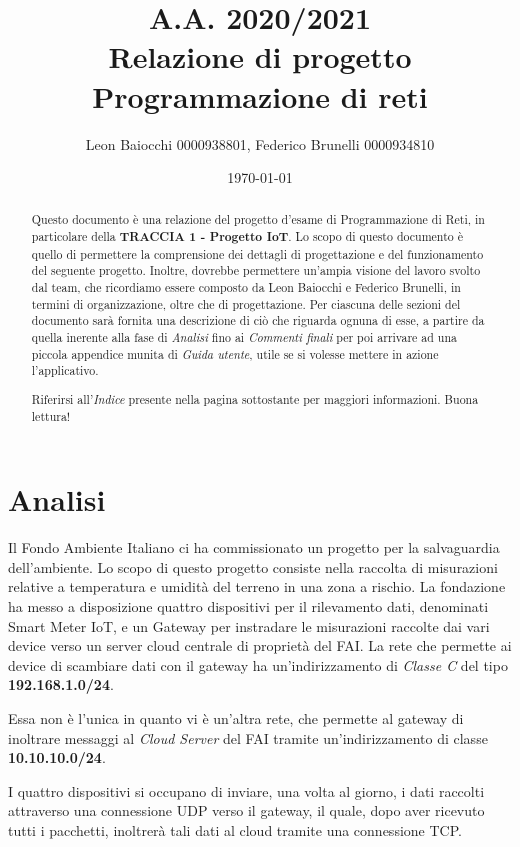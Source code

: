 \documentclass[a4paper,12pt]{report}
\title{A.A. 2020/2021\\Relazione di progetto\\Programmazione di reti}
\author{Leon Baiocchi 0000938801, Federico Brunelli 0000934810}
\date{\today}
\begin{document}
\maketitle

\begin{abstract}
Questo documento è una relazione del progetto d'esame di Programmazione di Reti, in particolare della \textbf{TRACCIA 1 - Progetto IoT}.
%
Lo scopo di questo documento è quello di permettere la comprensione dei dettagli di progettazione e del funzionamento del seguente progetto.
%
Inoltre, dovrebbe permettere un'ampia visione del lavoro svolto dal team, che ricordiamo essere composto da Leon Baiocchi e Federico Brunelli, in termini di organizzazione, oltre che di progettazione.
%
Per ciascuna delle sezioni del documento sarà fornita una descrizione di ciò che riguarda ognuna di esse, a partire da quella inerente alla fase di \emph{Analisi} fino ai \emph{Commenti finali} per poi arrivare ad una piccola appendice munita di \emph{Guida utente}, utile se si volesse mettere in azione l'applicativo.

Riferirsi all'\emph{Indice} presente nella pagina sottostante per maggiori informazioni.
%
Buona lettura!
\end{abstract}

\tableofcontents

\chapter{Analisi}

Il Fondo Ambiente Italiano ci ha commissionato un progetto per la salvaguardia dell'ambiente.
%
Lo scopo di questo progetto consiste nella raccolta di misurazioni relative a temperatura e umidità del terreno in una zona a rischio.
%
La fondazione ha messo a disposizione quattro dispositivi per il rilevamento dati, denominati Smart Meter IoT, e un Gateway per instradare le misurazioni raccolte dai vari device verso un server cloud centrale di proprietà del FAI.
%
La rete che permette ai device di scambiare dati con il gateway ha un'indirizzamento di \emph{Classe C} del tipo \textbf{192.168.1.0/24}.

Essa non è l'unica in quanto vi è un'altra rete, che permette al gateway di inoltrare messaggi al \emph{Cloud Server} del FAI tramite un'indirizzamento di classe \textbf{10.10.10.0/24}.

I quattro dispositivi si occupano di inviare, una volta al giorno, i dati raccolti attraverso una connessione UDP verso il gateway, il quale, dopo aver ricevuto tutti i pacchetti, inoltrerà tali dati al cloud tramite una connessione TCP.
\end{document}
